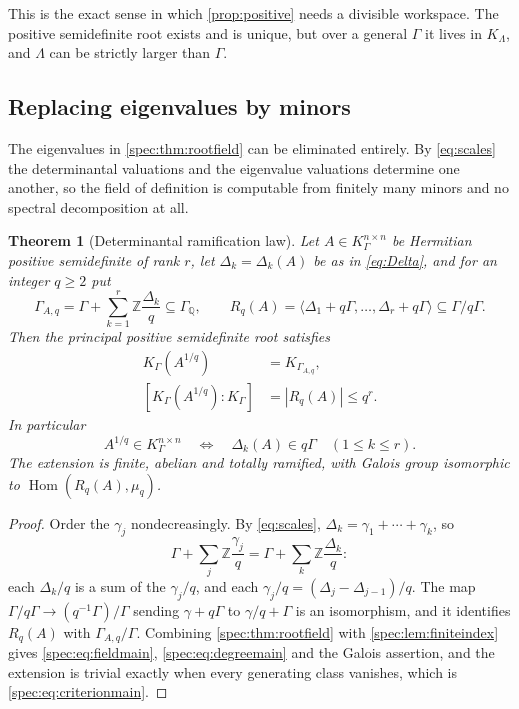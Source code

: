 \documentclass[11pt,a4paper]{article}
\numberwithin{equation}{section}
\newtheorem{theorem}{Theorem}[section]
\theoremstyle{definition}
\theoremstyle{remark}
\newcommand{\Q}{\mathbb Q}
\newcommand{\Z}{\mathbb Z}
\newcommand{\Hom}{\operatorname{Hom}}
\begin{document}
This is the exact sense in which \cref{prop:positive} needs a divisible
workspace. The positive semidefinite root exists and is unique, but over a
general $\Gamma$ it lives in $K_\Lambda$, and $\Lambda$ can be strictly
larger than $\Gamma$.

\subsection{Replacing eigenvalues by minors}

The eigenvalues in \cref{spec:thm:rootfield} can be eliminated entirely. By
\eqref{eq:scales} the determinantal valuations and the eigenvalue valuations
determine one another, so the field of definition is computable from
finitely many minors and no spectral decomposition at all.

\begin{theorem}[Determinantal ramification law]\label{spec:thm:ramification}
Let $A\in K_\Gamma^{n\times n}$ be Hermitian positive semidefinite of rank
$r$, let $\Delta_k=\Delta_k(A)$ be as in \eqref{eq:Delta}, and for an
integer $q\ge2$ put
\begin{equation}\label{spec:eq:rootgroup}
 \Gamma_{A,q}=\Gamma+\sum_{k=1}^r\Z\frac{\Delta_k}q\subseteq\Gamma_\Q,
 \qquad
 R_q(A)=\bigl\langle \Delta_1+q\Gamma,\ldots,\Delta_r+q\Gamma\bigr\rangle
   \subseteq\Gamma/q\Gamma.
\end{equation}
Then the principal positive semidefinite root satisfies
\begin{align}
 K_\Gamma(A^{1/q})&=K_{\Gamma_{A,q}},\label{spec:eq:fieldmain}\\
 [K_\Gamma(A^{1/q}):K_\Gamma]&=|R_q(A)|\le q^r.\label{spec:eq:degreemain}
\end{align}
In particular
\begin{equation}\label{spec:eq:criterionmain}
 A^{1/q}\in K_\Gamma^{n\times n}
 \quad\Longleftrightarrow\quad
 \Delta_k(A)\in q\Gamma\quad(1\le k\le r).
\end{equation}
The extension is finite, abelian and totally ramified, with Galois group
isomorphic to $\Hom(R_q(A),\mu_q)$.
\end{theorem}
\begin{proof}
Order the $\gamma_j$ nondecreasingly. By \eqref{eq:scales},
$\Delta_k=\gamma_1+\cdots+\gamma_k$, so
\begin{equation}\label{spec:eq:samelattice}
 \Gamma+\sum_j\Z\frac{\gamma_j}q=\Gamma+\sum_k\Z\frac{\Delta_k}q:
\end{equation}
each $\Delta_k/q$ is a sum of the $\gamma_j/q$, and each
$\gamma_j/q=(\Delta_j-\Delta_{j-1})/q$. The map
$\Gamma/q\Gamma\to(q^{-1}\Gamma)/\Gamma$ sending $\gamma+q\Gamma$ to
$\gamma/q+\Gamma$ is an isomorphism, and it identifies $R_q(A)$ with
$\Gamma_{A,q}/\Gamma$. Combining \cref{spec:thm:rootfield} with
\cref{spec:lem:finiteindex} gives
\eqref{spec:eq:fieldmain}, \eqref{spec:eq:degreemain} and the Galois
assertion, and the extension is trivial exactly when every generating class
vanishes, which is \eqref{spec:eq:criterionmain}.
\end{proof}
\end{document}
